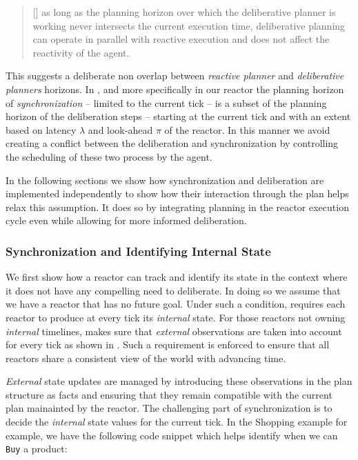 {\scriptsize
  \begin{quote}
  [\textellipsis] as long as the planning horizon over which the
  deliberative planner is working never intersects the current
  execution time, deliberative planning can operate in parallel with
  reactive execution and does not affect the reactivity of the agent. 
\end{quote}}

This suggests a deliberate non overlap between {\em reactive planner}
and {\em deliberative planners} horizons. In \rx, and more
specifically in our \eu reactor the planning horizon of {\em
  synchronization} -- limited to the current tick -- is a subset of
the planning horizon of the deliberation steps -- starting at the
current tick and with an extent based on latency $\lambda$ and
look-ahead $\pi$ of the reactor. In this manner we avoid creating a
conflict between the deliberation and synchronization by controlling
the scheduling of these two process by the \rx agent.

In the following sections we show how synchronization and deliberation
are implemented independently to show how their interaction through
the plan helps relax this assumption. It does so by integrating
planning in the reactor execution cycle even while allowing for more
informed deliberation.

\subsubsection{Synchronization and Identifying Internal State}
\label{sec:arch:synch}

We first show how a reactor can track and identify its state in the
context where it does not have any compelling need to deliberate. In
doing so we assume that we have a reactor that has no future
goal. Under such a condition, \rx requires each reactor to produce at
every tick its {\em internal} state. For those reactors not owning
{\em internal} timelines, \rx makes sure that {\em external}
observations are taken into account for every tick as shown in
\cite{py10}. Such a requirement is enforced to ensure that all
reactors share a consistent view of the world with advancing time.

{\em External} state updates are managed by introducing these
observations in the plan structure as facts and ensuring that they
remain compatible with the current plan mainainted by the reactor. The
challenging part of synchronization is to decide the {\em internal}
state values for the current tick. In the Shopping example for example,
we have the following code snippet which helps identify when we can
\texttt{Buy} a product:

